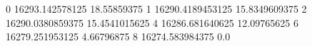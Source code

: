 0 16293.142578125 18.55859375
1 16290.4189453125 15.8349609375
2 16290.0380859375 15.4541015625
4 16286.681640625 12.09765625
6 16279.251953125 4.66796875
8 16274.583984375 0.0
